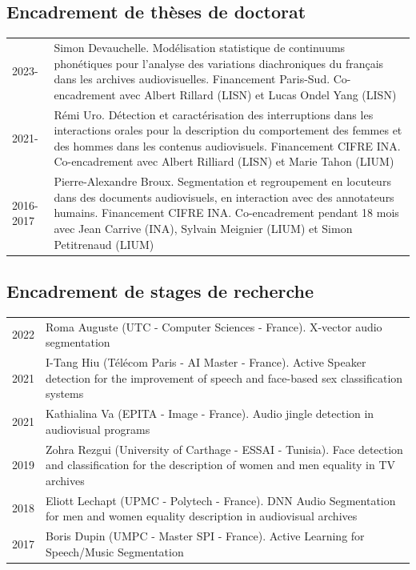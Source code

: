 \begin{fr}
\subsection{Encadrement de thèses de doctorat}
\begin{tabularx}{\linewidth}{@{}l X@{}}
2023- & Simon Devauchelle. Modélisation statistique de continuums phonétiques pour l'analyse des variations diachroniques du français dans les archives audiovisuelles. Financement Paris-Sud. Co-encadrement avec Albert Rillard (LISN) et Lucas Ondel Yang (LISN)\\
2021- & Rémi Uro. Détection et caractérisation des interruptions dans les interactions orales pour la description du comportement des femmes et des hommes dans les contenus audiovisuels. Financement CIFRE INA. Co-encadrement avec Albert Rilliard (LISN) et Marie Tahon (LIUM)\\
2016-2017 & Pierre-Alexandre Broux. Segmentation et regroupement en locuteurs dans des documents audiovisuels, en interaction avec des annotateurs humains. Financement CIFRE INA. Co-encadrement pendant 18 mois avec Jean Carrive (INA), Sylvain Meignier (LIUM) et Simon Petitrenaud (LIUM)\\
\end{tabularx}
\subsection{Encadrement de stages de recherche}
\begin{tabularx}{\linewidth}{@{}l X@{}}
2022 & Roma Auguste (UTC - Computer Sciences - France). X-vector audio segmentation\\
2021 & I-Tang Hiu (Télécom Paris - AI Master - France). Active Speaker detection for the improvement of speech and face-based sex classification systems\\
2021 & Kathialina Va (EPITA - Image - France). Audio jingle detection in audiovisual programs\\
2019 & Zohra Rezgui (University of Carthage - ESSAI - Tunisia). Face detection and classification for the description of women and men equality in TV archives\\
2018 & Eliott Lechapt (UPMC - Polytech - France). DNN Audio Segmentation for men and women equality description in audiovisual archives\\
2017 & Boris Dupin (UMPC - Master SPI - France). Active Learning for Speech/Music Segmentation\\
\end{tabularx}

\end{fr}



